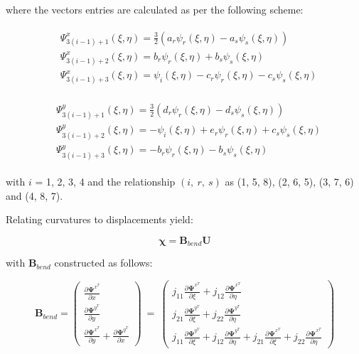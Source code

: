 where the vectors entries are calculated as per the following scheme:

\begin{gather} 
	\begin{aligned}
		&\Psi_{3(i-1)+1}^x (\xi , \eta) = \frac{3}{2} (a_r \psi_r (\xi , \eta) - a_s \psi_s (\xi , \eta) ) \\
		&\Psi_{3(i-1)+2}^x (\xi , \eta) = b_r \psi_r (\xi , \eta) + b_s \psi_s (\xi , \eta) \\
		&\Psi_{3(i-1)+3}^x (\xi , \eta) = \psi_i (\xi , \eta) - c_r \psi_r (\xi , \eta) - c_s \psi_s (\xi , \eta)
		\label{equation25}
	\end{aligned}
\end{gather}

\begin{gather} 
	\begin{aligned}
		&\Psi_{3(i-1)+1}^y (\xi , \eta) = \frac{3}{2} (d_r \psi_r (\xi , \eta) - d_s \psi_s (\xi , \eta) ) \\
		&\Psi_{3(i-1)+2}^y (\xi , \eta) = -\psi_i (\xi , \eta) + e_r \psi_r (\xi , \eta) + c_s \psi_s (\xi , \eta) \\
		&\Psi_{3(i-1)+3}^y (\xi , \eta) = -b_r \psi_r (\xi , \eta) - b_s \psi_s (\xi , \eta)
		\label{equation26}
	\end{aligned}
\end{gather}

with $i$ = 1, 2, 3, 4 and the relationship $(i,\ r,\ s)$ as (1, 5, 8), (2, 6, 5), (3, 7, 6) and (4, 8, 7).

Relating curvatures to displacements yield:

\begin{equation} 
\boldsymbol{\chi} = \mathbf{B}_{bend} \mathbf{U}
\label{equation27}
\end{equation}

with $\mathbf{B}_{bend}$ constructed as follows:

\begin{equation} 
\mathbf{B}_{bend} =
\begin{pmatrix}
\frac{\partial \mathbf{\Psi}^{x^T}}{\partial x} \\
\frac{\partial \mathbf{\Psi}^{y^T}}{\partial y} \\
\frac{\partial \mathbf{\Psi}^{x^T}}{\partial y} + \frac{\partial \mathbf{\Psi}^{y^T}}{\partial x}
\end{pmatrix}
\ =\ 
\begin{pmatrix}
j_{11} \frac{\partial \mathbf{\Psi}^{x^T}}{\partial \xi}  + j_{12} \frac{\partial \mathbf{\Psi}^{x^T}}{\partial \eta}  \\
j_{21} \frac{\partial \mathbf{\Psi}^{y^T}}{\partial \xi} + j_{22} \frac{\partial \mathbf{\Psi}^{y^T}}{\partial \eta} \\
j_{11} \frac{\partial \mathbf{\Psi}^{y^T}}{\partial \xi}  + j_{12} \frac{\partial \mathbf{\Psi}^{y^T}}{\partial \eta} + j_{21} \frac{\partial \mathbf{\Psi}^{x^T}}{\partial \xi} + j_{22} \frac{\partial \mathbf{\Psi}^{x^T}}{\partial \eta}
\end{pmatrix}
\label{equation28}
\end{equation}

